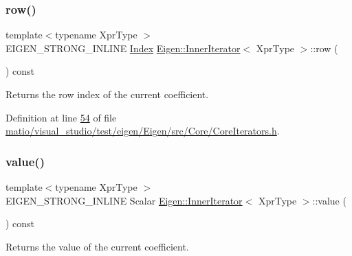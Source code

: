 \subsubsection{\texorpdfstring{row()}{row()}\hspace{0.1cm}{\footnotesize\ttfamily [2/2]}}
{\footnotesize\ttfamily template$<$typename Xpr\+Type $>$ \\
E\+I\+G\+E\+N\+\_\+\+S\+T\+R\+O\+N\+G\+\_\+\+I\+N\+L\+I\+NE \hyperlink{namespace_eigen_a62e77e0933482dafde8fe197d9a2cfde}{Index} \hyperlink{class_eigen_1_1_inner_iterator}{Eigen\+::\+Inner\+Iterator}$<$ Xpr\+Type $>$\+::row (\begin{DoxyParamCaption}{ }\end{DoxyParamCaption}) const\hspace{0.3cm}{\ttfamily [inline]}}

\begin{DoxyReturn}{Returns}
the row index of the current coefficient. 
\end{DoxyReturn}


Definition at line \hyperlink{matio_2visual__studio_2test_2eigen_2_eigen_2src_2_core_2_core_iterators_8h_source_l00054}{54} of file \hyperlink{matio_2visual__studio_2test_2eigen_2_eigen_2src_2_core_2_core_iterators_8h_source}{matio/visual\+\_\+studio/test/eigen/\+Eigen/src/\+Core/\+Core\+Iterators.\+h}.

\mbox{\label{class_eigen_1_1_inner_iterator_ab04bccb41eb22ffcb92dc61125aab119}} 
\subsubsection{\texorpdfstring{value()}{value()}\hspace{0.1cm}{\footnotesize\ttfamily [1/2]}}
{\footnotesize\ttfamily template$<$typename Xpr\+Type $>$ \\
E\+I\+G\+E\+N\+\_\+\+S\+T\+R\+O\+N\+G\+\_\+\+I\+N\+L\+I\+NE Scalar \hyperlink{class_eigen_1_1_inner_iterator}{Eigen\+::\+Inner\+Iterator}$<$ Xpr\+Type $>$\+::value (\begin{DoxyParamCaption}{ }\end{DoxyParamCaption}) const\hspace{0.3cm}{\ttfamily [inline]}}

\begin{DoxyReturn}{Returns}
the value of the current coefficient. 
\end{DoxyReturn}


